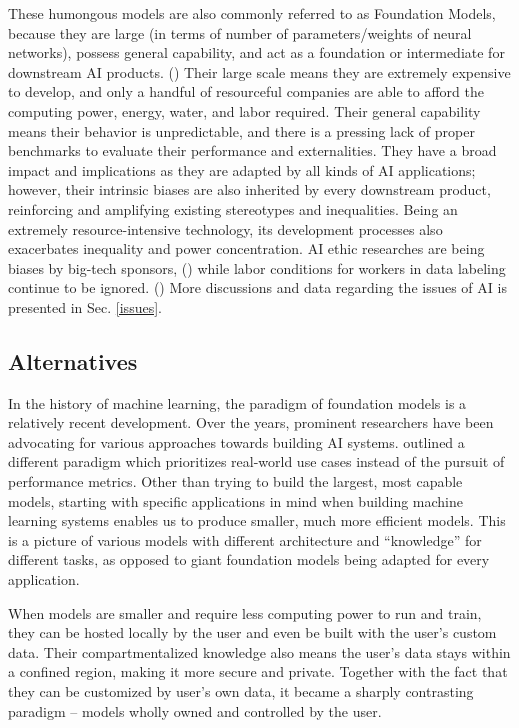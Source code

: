 \documentclass[12pt]{article}
\begin{document}
These humongous models are also commonly referred to as Foundation Models, because they are large (in terms of number of parameters/weights of neural networks), possess general capability, and act as a foundation or intermediate for downstream AI products. (\cite{bommasani2022opportunitiesrisksfoundationmodels}) Their large scale means they are extremely expensive to develop, and only a handful of resourceful companies are able to afford the computing power, energy, water, and labor required. Their general capability means their behavior is unpredictable, and there is a pressing lack of proper benchmarks to evaluate their performance and externalities. They have a broad impact and implications as they are adapted by all kinds of AI applications; however, their intrinsic biases are also inherited by every downstream product, reinforcing and amplifying existing stereotypes and inequalities. Being an extremely resource-intensive technology, its development processes also exacerbates inequality and power concentration. AI ethic researches are being biases by big-tech sponsors, (\cite{10.1145/3461702.3462563}) while labor conditions for workers in data labeling continue to be ignored. (\cite{empire}) More discussions and data regarding the issues of AI is presented in Sec. \ref{issues}.

\subsection{Alternatives}
In the history of machine learning, the paradigm of foundation models is a relatively recent development. Over the years, prominent researchers have been advocating for various approaches towards building AI systems. \cite{10.5555/3042573.3042809} outlined a different paradigm which prioritizes real-world use cases instead of the pursuit of performance metrics. Other than trying to build the largest, most capable models, starting with specific applications in mind when building machine learning systems enables us to produce smaller, much more efficient models. This is a picture of various models with different architecture and ``knowledge'' for different tasks, as opposed to giant foundation models being adapted for every application. 

When models are smaller and require less computing power to run and train, they can be hosted locally by the user and even be built with the user's custom data. Their compartmentalized knowledge also means the user's data stays within a confined region, making it more secure and private. Together with the fact that they can be customized by user's own data, it became a sharply contrasting paradigm -- models wholly owned and controlled by the user.
\end{document}

